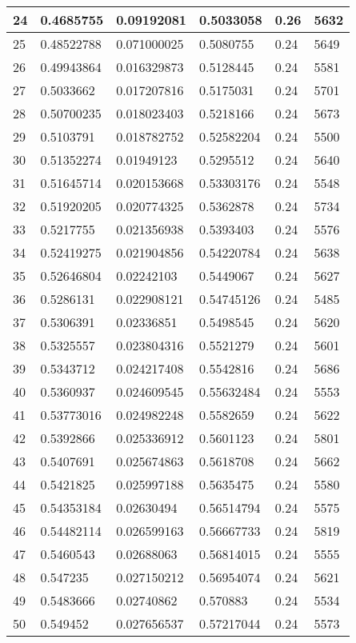\begin{longtable}{|l|l|l|l|l|l|}
24 & 0.4685755 & 0.09192081 & 0.5033058 & 0.26 & 5632 \\ \hline 
25 & 0.48522788 & 0.071000025 & 0.5080755 & 0.24 & 5649 \\ \hline 
26 & 0.49943864 & 0.016329873 & 0.5128445 & 0.24 & 5581 \\ \hline 
27 & 0.5033662 & 0.017207816 & 0.5175031 & 0.24 & 5701 \\ \hline 
28 & 0.50700235 & 0.018023403 & 0.5218166 & 0.24 & 5673 \\ \hline 
29 & 0.5103791 & 0.018782752 & 0.52582204 & 0.24 & 5500 \\ \hline 
30 & 0.51352274 & 0.01949123 & 0.5295512 & 0.24 & 5640 \\ \hline 
31 & 0.51645714 & 0.020153668 & 0.53303176 & 0.24 & 5548 \\ \hline 
32 & 0.51920205 & 0.020774325 & 0.5362878 & 0.24 & 5734 \\ \hline 
33 & 0.5217755 & 0.021356938 & 0.5393403 & 0.24 & 5576 \\ \hline 
34 & 0.52419275 & 0.021904856 & 0.54220784 & 0.24 & 5638 \\ \hline 
35 & 0.52646804 & 0.02242103 & 0.5449067 & 0.24 & 5627 \\ \hline 
36 & 0.5286131 & 0.022908121 & 0.54745126 & 0.24 & 5485 \\ \hline 
37 & 0.5306391 & 0.02336851 & 0.5498545 & 0.24 & 5620 \\ \hline 
38 & 0.5325557 & 0.023804316 & 0.5521279 & 0.24 & 5601 \\ \hline 
39 & 0.5343712 & 0.024217408 & 0.5542816 & 0.24 & 5686 \\ \hline 
40 & 0.5360937 & 0.024609545 & 0.55632484 & 0.24 & 5553 \\ \hline 
41 & 0.53773016 & 0.024982248 & 0.5582659 & 0.24 & 5622 \\ \hline 
42 & 0.5392866 & 0.025336912 & 0.5601123 & 0.24 & 5801 \\ \hline 
43 & 0.5407691 & 0.025674863 & 0.5618708 & 0.24 & 5662 \\ \hline 
44 & 0.5421825 & 0.025997188 & 0.5635475 & 0.24 & 5580 \\ \hline 
45 & 0.54353184 & 0.02630494 & 0.56514794 & 0.24 & 5575 \\ \hline 
46 & 0.54482114 & 0.026599163 & 0.56667733 & 0.24 & 5819 \\ \hline 
47 & 0.5460543 & 0.02688063 & 0.56814015 & 0.24 & 5555 \\ \hline 
48 & 0.547235 & 0.027150212 & 0.56954074 & 0.24 & 5621 \\ \hline 
49 & 0.5483666 & 0.02740862 & 0.570883 & 0.24 & 5534 \\ \hline 
50 & 0.549452 & 0.027656537 & 0.57217044 & 0.24 & 5573 \\ \hline 
\end{longtable}